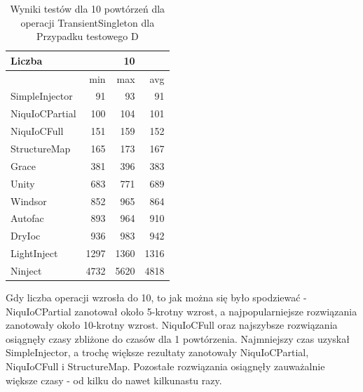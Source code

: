 \documentclass[12pt]{article}
\begin{document}
\begin{table}[H]
\captionsetup{belowskip=0pt,aboveskip=0pt}
\begin{center}
\begin{small}
	\begin{tabular}{ | l | r r r | }
    		\hline
Liczba & & 10 & \\ \hline
 & min & max & avg \\ \hline
SimpleInjector & 91 & 93 & 91 \\ \hline
NiquIoCPartial & 100 & 104 & 101 \\ \hline
NiquIoCFull & 151 & 159 & 152 \\ \hline
StructureMap & 165 & 173 & 167 \\ \hline
Grace & 381 & 396 & 383 \\ \hline
Unity & 683 & 771 & 689 \\ \hline
Windsor & 852 & 965 & 864 \\ \hline
Autofac & 893 & 964 & 910 \\ \hline
DryIoc & 936 & 983 & 942 \\ \hline
LightInject & 1297 & 1360 & 1316 \\ \hline
Ninject & 4732 & 5620 & 4818 \\ \hline
  	\end{tabular}
\end{small}
\end{center}
\caption{Wyniki testów dla 10 powtórzeń dla operacji TransientSingleton dla Przypadku testowego D}
\label{TestCaseD_TransientSingleton10}
\end{table}
Gdy liczba operacji wzrosła do 10, to jak można się było spodziewać - NiquIoCPartial zanotował około 5-krotny wzrost, a najpopularniejsze rozwiązania zanotowały około 10-krotny wzrost. NiquIoCFull oraz najszybsze rozwiązania osiągnęły czasy zbliżone do czasów dla 1 powtórzenia. Najmniejszy czas uzyskał SimpleInjector, a trochę większe rezultaty zanotowały NiquIoCPartial, NiquIoCFull i StructureMap. Pozostałe rozwiązania osiągnęły zauważalnie większe czasy - od kilku do nawet kilkunastu razy.
\end{document}
